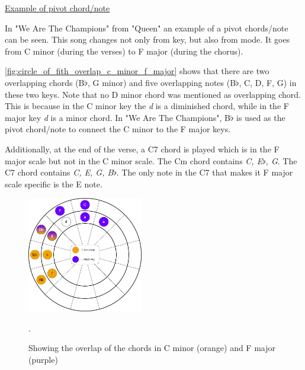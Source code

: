 \newpage

\underline{Example of pivot chord/note}

In "We Are The Champions" from "Queen" an example of a pivot chords/note can be seen. This song changes not only from key, but also from mode. It goes from C minor (during the verses) to F major (during the chorus).

\autoref{fig:circle_of_fith_overlap_c_minor_f_major} shows that there are two overlapping chords (B$\flat$, G minor) and five overlapping notes (B$\flat$, C, D, F, G) in these two keys. Note that no D minor chord was mentioned as overlapping chord. This is because in the C minor key the \textit{d} is a diminished chord, while in the F major key \textit{d} is a minor chord. In "We Are The Champions", B$\flat$ is used as the pivot chord/note to connect the C minor to the F major keys.

Additionally, at the end of the verse, a C7 chord is played which is in the F major scale but not in the C minor scale. The Cm chord contains \textit{C, E$\flat$, G}. The C7 chord contains \textit{C, E, G, B$\flat$}. The only note in the C7 that makes it F major scale specific is the E note.

\begin{figure}[h]
	\centering
	\includegraphics[width=0.45\textwidth]{../../Images/CircleOfFifthsCminorFmajor.png}
	\caption{Showing the overlap of the chords in C minor (orange) and F major (purple)}.
	\label{fig:circle_of_fith_overlap_c_minor_f_major}
\end{figure}


